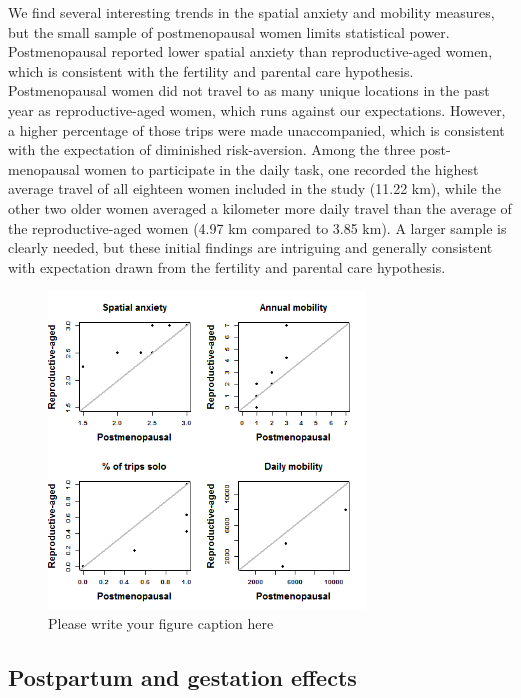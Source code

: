 We find several interesting trends in the spatial anxiety and mobility measures, but the small sample of postmenopausal women limits statistical power.  Postmenopausal reported lower spatial anxiety than reproductive-aged women, which is consistent with the fertility and parental care hypothesis.  Postmenopausal women did not travel to as many unique locations in the past year as reproductive-aged women, which runs against our expectations.  However, a higher percentage of those trips were made unaccompanied, which is consistent with the expectation of diminished risk-aversion.  Among the three post-menopausal women to participate in the daily task, one recorded the highest average travel of all eighteen women included in the study (11.22 km), while the other two older women averaged a kilometer more daily travel than the average of the reproductive-aged women (4.97 km compared to 3.85 km).  A larger sample is clearly needed, but these initial findings are intriguing and generally consistent with expectation drawn from the fertility and parental care hypothesis.

\begin{figure}[!htb]
  \includegraphics[width=0.75\textwidth]{QQ_pst}
\caption{Please write your figure caption here}
\label{fig:meno}       %
\end{figure}


	\subsection{Postpartum and gestation effects}
	\label{sec:3.3}
	
